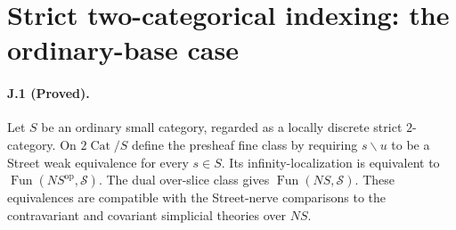 \section{Strict two-categorical indexing: the ordinary-base case}

\paragraph{J.1 (Proved).}
Let $S$ be an ordinary small category, regarded as a locally
discrete strict $2$-category. On $2\operatorname{Cat}/S$ define
the presheaf fine class by requiring $s\backslash u$ to be a
Street weak equivalence for every $s\in S$. Its infinity-localization
is equivalent to $\operatorname{Fun}(NS^{\mathrm{op}},\mathcal S)$.
The dual over-slice class gives
$\operatorname{Fun}(NS,\mathcal S)$. These equivalences are
compatible with the Street-nerve comparisons to the contravariant
and covariant simplicial theories over $NS$.
